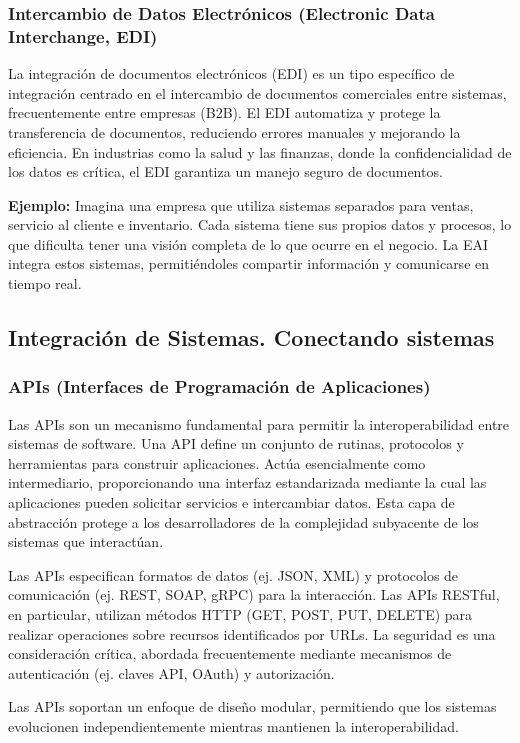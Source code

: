 \documentclass[12pt]{book}
\begin{document}
\subsubsection{Intercambio de Datos Electrónicos (Electronic Data Interchange, EDI)}
La integración de documentos electrónicos (EDI) es un tipo específico de integración centrado en el intercambio de documentos comerciales entre sistemas, frecuentemente entre empresas (B2B). El EDI automatiza y protege la transferencia de documentos, reduciendo errores manuales y mejorando la eficiencia. En industrias como la salud y las finanzas, donde la confidencialidad de los datos es crítica, el EDI garantiza un manejo seguro de documentos.

\textbf{Ejemplo:} Imagina una empresa que utiliza sistemas separados para ventas, servicio al cliente e inventario. Cada sistema tiene sus propios datos y procesos, lo que dificulta tener una visión completa de lo que ocurre en el negocio. La EAI integra estos sistemas, permitiéndoles compartir información y comunicarse en tiempo real.

\subsection{Integración de Sistemas. Conectando sistemas}
\subsubsection{APIs (Interfaces de Programación de Aplicaciones)}
Las APIs son un mecanismo fundamental para permitir la interoperabilidad entre sistemas de software. Una API define un conjunto de rutinas, protocolos y herramientas para construir aplicaciones. Actúa esencialmente como intermediario, proporcionando una interfaz estandarizada mediante la cual las aplicaciones pueden solicitar servicios e intercambiar datos. Esta capa de abstracción protege a los desarrolladores de la complejidad subyacente de los sistemas que interactúan.

Las APIs especifican formatos de datos (ej. JSON, XML) y protocolos de comunicación (ej. REST, SOAP, gRPC) para la interacción. Las APIs RESTful, en particular, utilizan métodos HTTP (GET, POST, PUT, DELETE) para realizar operaciones sobre recursos identificados por URLs. La seguridad es una consideración crítica, abordada frecuentemente mediante mecanismos de autenticación (ej. claves API, OAuth) y autorización.

Las APIs soportan un enfoque de diseño modular, permitiendo que los sistemas evolucionen independientemente mientras mantienen la interoperabilidad.
\end{document}
